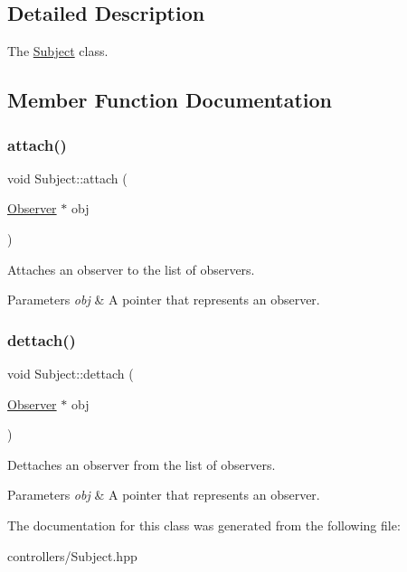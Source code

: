 \subsection{Detailed Description}
The \hyperlink{class_subject}{Subject} class. 

\subsection{Member Function Documentation}
\mbox{\label{class_subject_ac276c84c5d4fd6df3fb9025c131fa10d}} 
\subsubsection{\texorpdfstring{attach()}{attach()}}
{\footnotesize\ttfamily void Subject\+::attach (\begin{DoxyParamCaption}\item[{\hyperlink{class_observer}{Observer} $\ast$}]{obj }\end{DoxyParamCaption})\hspace{0.3cm}{\ttfamily [inline]}}



Attaches an observer to the list of observers. 


\begin{DoxyParams}{Parameters}
{\em obj} & A pointer that represents an observer. \\
\hline
\end{DoxyParams}
\mbox{\label{class_subject_ad4959e3d82f295326fb003df4a38c522}} 
\subsubsection{\texorpdfstring{dettach()}{dettach()}}
{\footnotesize\ttfamily void Subject\+::dettach (\begin{DoxyParamCaption}\item[{\hyperlink{class_observer}{Observer} $\ast$}]{obj }\end{DoxyParamCaption})\hspace{0.3cm}{\ttfamily [inline]}}



Dettaches an observer from the list of observers. 


\begin{DoxyParams}{Parameters}
{\em obj} & A pointer that represents an observer. \\
\hline
\end{DoxyParams}


The documentation for this class was generated from the following file\+:\begin{DoxyCompactItemize}
\item 
controllers/Subject.\+hpp\end{DoxyCompactItemize}
